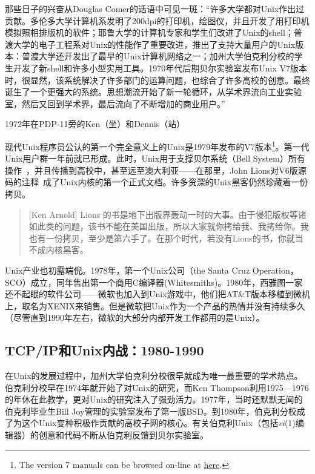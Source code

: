 \documentclass[12pt,oneside]{ctexbook}
\begin{document}
\begin{common-format}
那些日子的兴奋从Douglas Comer的话语中可见一斑：“许多大学都对Unix作出过贡献。多伦多大学计算机系发明了200dpi的打印机，绘图仪，并且开发了用打印机模拟照相排版机的软件；耶鲁大学的计算机专家和学生们改进了Unix的shell；普渡大学的电子工程系对Unix的性能作了重要改进，推出了支持大量用户的Unix版本：普渡大学还开发出了最早的Unix计算机网络之一；加州大学伯克利分校的学生开发了新shell和许多小型实用工具。1970年代后期贝尔实验室发布Unix V7版本时，很显然，该系统解决了许多部门的运算问题，也综合了许多高校的创意。最终诞生了一个更强大的系统。思想潮流开始了新一轮循环，从学术界流向工业实验室，然后又回到学术界，最后流向了不断增加的商业用户。”~\cite{Comer}
\begin{fig}[7]{1972年在PDP-11旁的Ken（坐）和Dennis（站）}
\label{fig:1972年在PDP-11旁的Ken（坐）和Dennis（站）}
\end{fig}

现代Unix程序员公认的第一个完全意义上的Unix是1979年发布的V7版本\footnote{The version 7 manuals can be browsed on-line at \href{http://plan9.bell-labs.com/7thEdMan/index.html}{here}.}。第一代Unix用户群一年前就已形成。此时，Unix用于支撑贝尔系统（Bell System）所有操作~\cite{Hauben}，并且传播到高校中，甚至远至澳大利亚——在那里，John Lions对V6版源码的注释~\cite{Lions}成了Unix内核的第一个正式文档。许多资深的Unix黑客仍然珍藏着一份拷贝。

\begin{quote}[Ken Arnold]
Lions 的书是地下出版界轰动一时的大事。由于侵犯版权等诸如此类的问题，该书不能在美国出版，所以大家就你拷给我、我拷给你。我也有一份拷贝，至少是第六手了。在那个时代，若没有Lions的书，你就当不成内核黑客。
\end{quote}

Unix产业也初露端倪。1978年，第一个Unix公司（the Santa Cruz Operation，SCO）成立，同年售出第一个商用C编译器(Whitesmiths)。1980年，西雅图一家还不起眼的软件公司——微软也加入到Unix游戏中，他们把AT\&{}T版本移植到微机上，取名为XENIX来销售。但是微软把Unix作为一个产品的热情并没有持续多久（尽管直到1990年左右，微软的大部分内部开发工作都用的是Unix）。

\subsection{TCP/IP和Unix内战：1980-1990}
在Unix的发展过程中，加州大学伯克利分校很早就成为唯一最重要的学术热点。伯克利分校早在1974年就开始了对Unix的研究，而Ken Thompson利用1975—1976的年休在此教学，更对Unix的研究注入了强劲活力。1977年，当时还默默无闻的伯克利毕业生Bill Joy管理的实验室发布了第一版BSD。到1980年，伯克利分校成了为这个Unix变种积极作贡献的高校子网的核心。有关伯克利Unix（包括\textit{vi}(1)编辑器）的创意和代码不断从伯克利反馈到贝尔实验室。


\end{common-format}
\end{document}

